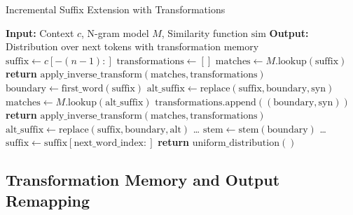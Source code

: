 \documentclass{article}
\theoremstyle{definition}
\begin{document}
\begin{algorithm}
\caption{Incremental Suffix Extension with Transformations}
\begin{algorithmic}[1]
\STATE \textbf{Input:} Context $c$, N-gram model $M$, Similarity function $\text{sim}$
\STATE \textbf{Output:} Distribution over next tokens with transformation memory
\STATE
\STATE $\text{suffix} \leftarrow c[-(n-1):]$ 
\STATE $\text{transformations} \leftarrow []$ 
\STATE
{}
    \STATE $\text{matches} \leftarrow M.\text{lookup}(\text{suffix})$
        \STATE \textbf{return} $\text{apply\_inverse\_transform}(\text{matches}, \text{transformations})$
    \ENDIF
    \STATE
    \STATE {}
    \STATE $\text{boundary} \leftarrow \text{first\_word}(\text{suffix})$
    \STATE
    \STATE {}
        \STATE $\text{alt\_suffix} \leftarrow \text{replace}(\text{suffix}, \text{boundary}, \text{syn})$
        \STATE $\text{matches} \leftarrow M.\text{lookup}(\text{alt\_suffix})$
            \STATE $\text{transformations}.\text{append}((\text{boundary}, \text{syn}))$
            \STATE \textbf{return} $\text{apply\_inverse\_transform}(\text{matches}, \text{transformations})$
        \ENDIF
    \ENDFOR
    \STATE
    \STATE {}
            \STATE $\text{alt\_suffix} \leftarrow \text{replace}(\text{suffix}, \text{boundary}, \text{alt})$
            \STATE \ldots {}
        \ENDFOR
    \ENDIF
    \STATE
    \STATE {}
    \STATE $\text{stem} \leftarrow \text{stem}(\text{boundary})$
    \STATE \ldots {}
    \STATE
    \STATE {}
    \STATE $\text{suffix} \leftarrow \text{suffix}[\text{next\_word\_index}:]$
\ENDWHILE
\STATE
\STATE \textbf{return} $\text{uniform\_distribution}()$ 
\end{algorithmic}
\end{algorithm}

\subsection{Transformation Memory and Output Remapping}
\end{document}
